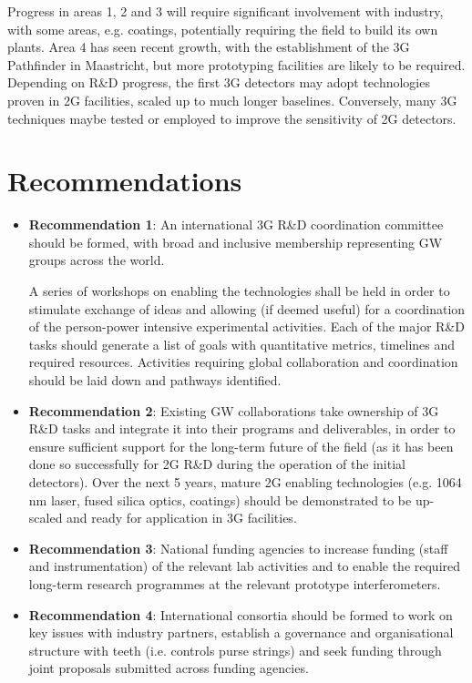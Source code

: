 \noindent Progress in areas 1, 2 and 3 will require significant involvement with industry, with some areas, e.g. coatings,  potentially requiring the field to build its own plants. Area 4 has seen recent growth, with the establishment of the 3G Pathfinder in Maastricht, but more prototyping facilities are likely to be required. Depending on R\&D progress, the first 3G detectors may adopt technologies proven in 2G facilities, scaled up to much longer baselines. Conversely, many 3G techniques maybe tested or employed to improve the sensitivity of 2G detectors. 

\section*{Recommendations}
 
\begin{itemize}
\item \textbf{Recommendation 1}:  An international 3G R\&D coordination committee should be formed, with broad and inclusive membership representing GW groups across the world.

 A series of workshops on enabling the technologies shall be held in order to stimulate exchange of ideas and allowing (if deemed useful) for a coordination of the person-power intensive experimental activities.  Each of the major R\&D tasks should generate a list of  goals with quantitative metrics,  timelines and required resources.   Activities requiring global collaboration and coordination should be laid down and pathways identified.

\item \textbf{Recommendation 2}: Existing GW collaborations take ownership of 3G R\&D tasks and integrate it into their programs and deliverables, in order to ensure sufficient support for the long-term future of the field (as it has been done so successfully for 2G R\&D during the operation of the initial detectors). Over the next 5 years, mature 2G enabling technologies (e.g. 1064\,nm laser, fused silica optics, coatings) should be demonstrated to be up-scaled and ready for application in 3G facilities.

\item \textbf{Recommendation 3}: National funding agencies to increase funding (staff and instrumentation) of the relevant lab activities and to enable the required long-term research programmes at the relevant prototype interferometers.

\item \textbf{Recommendation 4}:  International consortia should be formed to work on key issues with industry partners, establish a governance and organisational structure with teeth (i.e. controls purse strings) and seek funding through joint proposals submitted across funding agencies.
 

\end{itemize}

